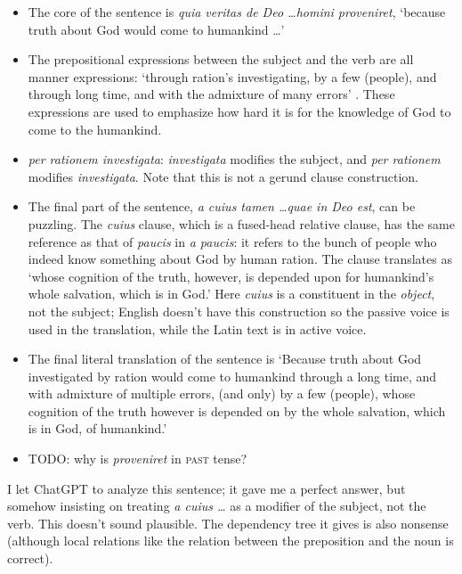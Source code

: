 \documentclass[a4paper, 12pt]{article}
\newcommand{\form}[1]{\emph{#1}}
\newcommand*{\category}[1]{\textsc{#1}}
\newcommand{\translate}[1]{`#1'}
\begin{document}
\begin{itemize}
    \item The core of the sentence is 
    \form{quia veritas de Deo \dots homini proveniret}, 
    \translate{because truth about God would come to humankind \dots}
    \item The prepositional expressions between the subject 
    and the verb are all manner expressions:
    \translate{through ration's investigating, by a few (people), 
    and through long time, and with the admixture of many errors} .
    These expressions are used to emphasize how hard it is 
    for the knowledge of God to come to the humankind.
    \item \form{per rationem investigata}: 
    \form{investigata} modifies the subject, 
    and \form{per rationem} modifies \form{investigata}.
    Note that this is not a gerund clause construction.
    \item The final part of the sentence, 
    \form{a cuius tamen \dots quae in Deo est}, 
    can be puzzling.
    The \form{cuius} clause, which is a fused-head relative clause, 
    has the same reference as that of \form{paucis} in \form{a paucis}: 
    it refers to the bunch of people 
    who indeed know something about God by human ration.
    The clause translates as 
    \translate{whose cognition of the truth, however, is depended upon 
    for humankind's whole salvation, which is in God.}
    Here \form{cuius} is a constituent in the \emph{object}, not the subject; 
    English doesn't have this construction 
    so the passive voice is used in the translation, 
    while the Latin text is in active voice.
    \item The final literal translation of the sentence is 
    \translate{Because truth about God investigated by ration 
    would come to humankind through a long time, 
    and with admixture of multiple errors,
    (and only) by a few (people),
    whose cognition of the truth however is depended on by the whole salvation, 
    which is in God, of humankind.}
    \item TODO: why is \form{proveniret} in \category{past} tense?
\end{itemize}

I let ChatGPT to analyze this sentence; 
it gave me a perfect answer, 
but somehow insisting on treating \form{a cuius \dots}
as a modifier of the subject, not the verb.
This doesn't sound plausible.
The dependency tree it gives is also nonsense
(although local relations like the relation between the preposition and the noun is correct).
\end{document}
